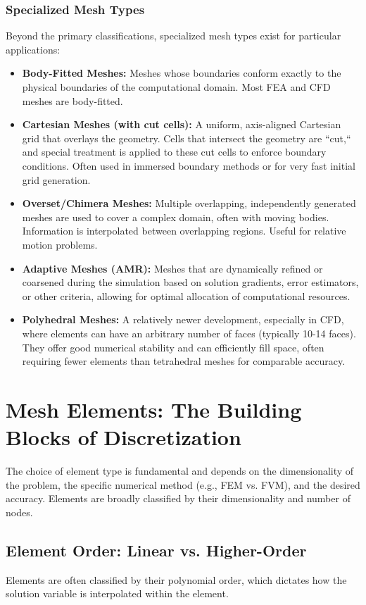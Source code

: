 \documentclass{book}
\begin{document}
\begin{itemize}[leftmargin=*,label=\textbullet]
\subsection{Specialized Mesh Types}
Beyond the primary classifications, specialized mesh types exist for particular applications:

\begin{itemize}[leftmargin=*,label=\textbullet]
    \item \textbf{Body-Fitted Meshes:} Meshes whose boundaries conform exactly to the physical boundaries of the computational domain. Most FEA and CFD meshes are body-fitted.
    \item \textbf{Cartesian Meshes (with cut cells):} A uniform, axis-aligned Cartesian grid that overlays the geometry. Cells that intersect the geometry are ``cut,`` and special treatment is applied to these cut cells to enforce boundary conditions. Often used in immersed boundary methods or for very fast initial grid generation.
    \item \textbf{Overset/Chimera Meshes:} Multiple overlapping, independently generated meshes are used to cover a complex domain, often with moving bodies. Information is interpolated between overlapping regions. Useful for relative motion problems.
    \item \textbf{Adaptive Meshes (AMR):} Meshes that are dynamically refined or coarsened during the simulation based on solution gradients, error estimators, or other criteria, allowing for optimal allocation of computational resources.
    \item \textbf{Polyhedral Meshes:} A relatively newer development, especially in CFD, where elements can have an arbitrary number of faces (typically 10-14 faces). They offer good numerical stability and can efficiently fill space, often requiring fewer elements than tetrahedral meshes for comparable accuracy.
\end{itemize}

\chapter{Mesh Elements: The Building Blocks of Discretization}

The choice of element type is fundamental and depends on the dimensionality of the problem, the specific numerical method (e.g., FEM vs. FVM), and the desired accuracy. Elements are broadly classified by their dimensionality and number of nodes.

\section{Element Order: Linear vs. Higher-Order}
Elements are often classified by their polynomial order, which dictates how the solution variable is interpolated within the element.


\end{itemize}
\end{document}
